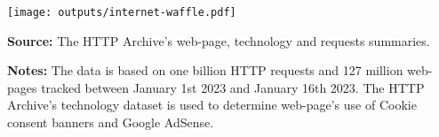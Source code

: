 \documentclass[border=0mm]{article}
\begin{document}
\begin{minipage}{0.05\textwidth}
    \hspace{\fill}
\end{minipage}
\begin{minipage}{0.45\textwidth}
    \vspace*{.2cm}

    \begin{rightframe}[width=1.03\textwidth,arc=10pt,auto outer arc]
    {\texttt{[image: outputs/internet-waffle.pdf]}
    \newline
    \vspace*{-.2cm}

    {\small\linespread{.2}\selectfont\fontsize{8pt}{.2cm}\selectfont
        \textbf{Source:} The HTTP Archive's web-page, technology and requests summaries.

        \textbf{Notes:} The data is based on one billion HTTP requests and 127 million 
        web-pages tracked between January 1st 2023 and January 16th 2023.
        The HTTP Archive's technology dataset is used to determine web-page's use of
        Cookie consent banners and Google AdSense.  \par} }
    \end{rightframe}
\end{minipage}
\end{document}
